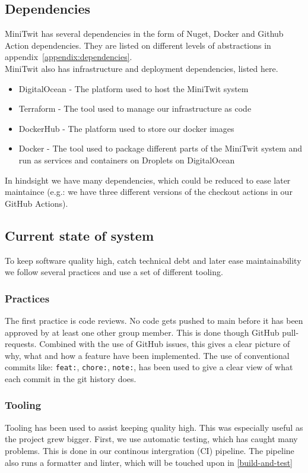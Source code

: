 \subsection{Dependencies}\label{dependencies}
MiniTwit has several dependencies in the form of Nuget, Docker and Github Action dependencies.
They are listed on different levels of abstractions in appendix~\ref{appendix:dependencies}.\\
MiniTwit also has infrastructure and deployment dependencies, listed here.
\begin{itemize}
    \item DigitalOcean - The platform used to host the MiniTwit system
    \item Terraform - The tool used to manage our infrastructure as code
    \item DockerHub - The platform used to store our docker images
    \item Docker - The tool used to package different parts of the MiniTwit system and run as services and containers on Droplets on DigitalOcean
\end{itemize}

In hindsight we have many dependencies, which could be reduced to ease later maintaince (e.g.: we have three different versions of the checkout actions in our GitHub Actions).

\subsection{Current state of system}\label{current-state-of-system}
To keep software quality high, catch technical debt and later ease maintainability we follow several practices and use a set of different tooling. 

\subsubsection{Practices}
The first practice is code reviews. No code gets pushed to main before it has been approved by at least one other group member. This is done though GitHub pull-requests.
Combined with the use of GitHub issues, this gives a clear picture of why, what and how a feature have been implemented.
The use of conventional commits like: \texttt{feat:}, \texttt{chore:}, \texttt{note:}, has been used to give a clear view of what each commit in the git history does. 

\subsubsection{Tooling}
Tooling has been used to assist keeping quality high.
This was especially useful as the project grew bigger. 
First, we use automatic testing, which has caught many problems. 
This is done in our continous intergration (CI) pipeline.
The pipeline also runs a formatter and linter, which will be touched upon in \ref{build-and-test} \\

